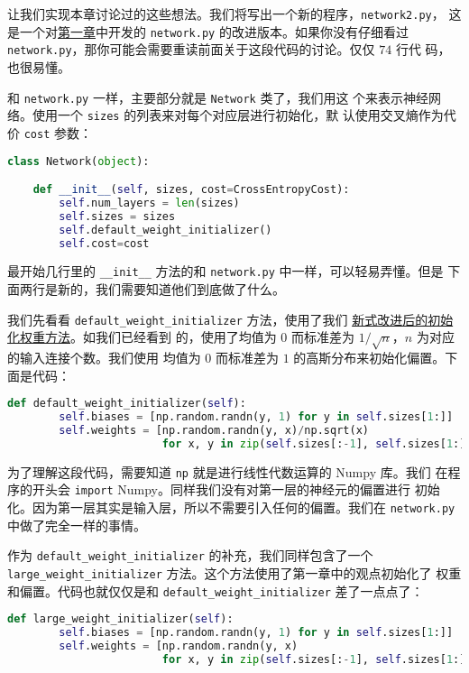 让我们实现本章讨论过的这些想法。我们将写出一个新的程序，\lstinline!network2.py!，
这是一个对\hyperref[sec:implementing_our_network_to_classify_digits]{第一章}中开发的 \lstinline!network.py! 的改进版本。如果你没有仔细看过
\lstinline!network.py!，那你可能会需要重读前面关于这段代码的讨论。仅仅 $74$ 行代
码，也很易懂。

和 \lstinline!network.py! 一样，主要部分就是 \lstinline!Network! 类了，我们用这
个来表示神经网络。使用一个 \lstinline!sizes! 的列表来对每个对应层进行初始化，默
认使用交叉熵作为代价 \lstinline!cost! 参数：
\begin{lstlisting}[language=Python]
class Network(object):

    def __init__(self, sizes, cost=CrossEntropyCost):
        self.num_layers = len(sizes)
        self.sizes = sizes
        self.default_weight_initializer()
        self.cost=cost
\end{lstlisting}

最开始几行里的 \lstinline!__init__! 方法的和 \lstinline!network.py! 中一样，可以轻易弄懂。但是
下面两行是新的，我们需要知道他们到底做了什么。

我们先看看 \lstinline!default_weight_initializer! 方法，使用了我们%
\hyperref[sec:weight_initialization]{新式改进后的初始化权重方法}。如我们已经看到
的，使用了均值为 $0$ 而标准差为 $1/\sqrt{n}$，$n$ 为对应的输入连接个数。我们使用
均值为 $0$ 而标准差为 $1$ 的高斯分布来初始化偏置。下面是代码：
\begin{lstlisting}[language=Python]
def default_weight_initializer(self):
        self.biases = [np.random.randn(y, 1) for y in self.sizes[1:]]
        self.weights = [np.random.randn(y, x)/np.sqrt(x) 
                        for x, y in zip(self.sizes[:-1], self.sizes[1:])]
\end{lstlisting}

为了理解这段代码，需要知道 \lstinline!np! 就是进行线性代数运算的 Numpy 库。我们
在程序的开头会 \lstinline!import! Numpy。同样我们没有对第一层的神经元的偏置进行
初始化。因为第一层其实是输入层，所以不需要引入任何的偏置。我们在
\lstinline!network.py! 中做了完全一样的事情。

作为 \lstinline!default_weight_initializer! 的补充，我们同样包含了一个
\lstinline!large_weight_initializer! 方法。这个方法使用了第一章中的观点初始化了
权重和偏置。代码也就仅仅是和 \lstinline!default_weight_initializer! 差了一点点了：
\begin{lstlisting}[language=Python]
def large_weight_initializer(self):
        self.biases = [np.random.randn(y, 1) for y in self.sizes[1:]]
        self.weights = [np.random.randn(y, x) 
                        for x, y in zip(self.sizes[:-1], self.sizes[1:])]
\end{lstlisting}

